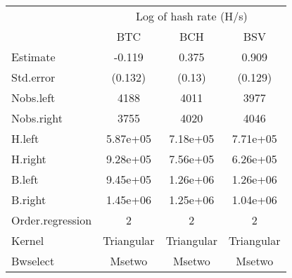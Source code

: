 
\begin{tabular}[t]{lccc}
\toprule
\multicolumn{1}{c}{ } & \multicolumn{3}{c}{Log of hash rate (H/s)} \\
\cmidrule(l{3pt}r{3pt}){2-4}
 & BTC & BCH & BSV\\
\midrule
Estimate & -0.119 & 0.375 & 0.909\\
Std.error & (0.132) & (0.13) & (0.129)\\
\midrule
Nobs.left & 4188 & 4011 & 3977\\
Nobs.right & 3755 & 4020 & 4046\\
H.left & 5.87e+05 & 7.18e+05 & 7.71e+05\\
H.right & 9.28e+05 & 7.56e+05 & 6.26e+05\\
B.left & 9.45e+05 & 1.26e+06 & 1.26e+06\\
B.right & 1.45e+06 & 1.25e+06 & 1.04e+06\\
Order.regression & 2 & 2 & 2\\
Kernel & Triangular & Triangular & Triangular\\
Bwselect & Msetwo & Msetwo & Msetwo\\
\bottomrule
\end{tabular}

